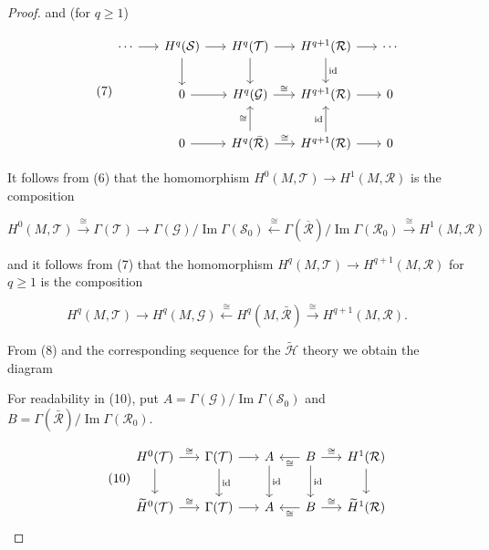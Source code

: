 \begin{proof}
and (for  $ q \geq 1 $)

\begin{equation}
\tag{7}\label{eq:5.23:7}
\begin{tikzcd}[ampersand replacement=\&, column sep=1.6em,row sep=2em]
\cdots \arrow[r] \& H^{q}(\mathcal S) \arrow[r] \arrow[d] \& H^{q}(\mathcal T) \arrow[r] \arrow[d] \& H^{q+1}(\mathcal R) \arrow[r] \arrow[d ,"{\mathrm{id}}"] \& \cdots \\
 \& 0 \arrow[r] \& H^{q}(\mathcal G) \arrow[r ,"{\cong}"] \& H^{q+1}(\mathcal R) \arrow[r] \& 0 \\
 \& 0 \arrow[r] \& H^{q}(\bar{\mathcal R}) \arrow[r ,"{\cong}"] \arrow[u ,"{\cong}"] \& H^{q+1}(\mathcal R) \arrow[r] \arrow[u ,"{\mathrm{id}}"] \& 0
\end{tikzcd}
\end{equation}

It follows from (6) that the homomorphism  $ H^{0}(M,\mathcal{T}) \to H^{1}(M,\mathcal{R}) $ is the composition

\begin{equation}
\tag{8}\label{eq:5.23:8}
H^0(M,\mathcal{T}) \xrightarrow{\cong} \Gamma(\mathcal{T}) \to \Gamma(\mathcal{G})/\operatorname{Im}\Gamma(\mathcal{S}_0) \xleftarrow{\cong} \Gamma(\overline{\mathcal{R}})/\operatorname{Im}\Gamma(\mathcal{R}_0) \xrightarrow{\cong} H^1(M,\mathcal{R})
\end{equation}

and it follows from (7) that the homomorphism  $ H^q(M,\mathcal{T}) \to H^{q+1}(M,\mathcal{R}) $ for  $ q \geq 1 $ is the composition

\begin{equation}
\tag{9}\label{eq:5.23:9}
H^{q}(M,\mathcal{T})\to H^{q}(M,\mathcal{G})\xleftarrow{\cong}H^{q}(M,\bar{\mathcal{R}})\xrightarrow{\cong}H^{q+1}(M,\mathcal{R}).
\end{equation}

From (8) and the corresponding sequence for the $\tilde{\mathcal{H}}$ theory we obtain the diagram

For readability in (10), put $A=\Gamma(\mathcal G)/\operatorname{Im}\Gamma(\mathcal S_0)$
and $B=\Gamma(\bar{\mathcal R})/\operatorname{Im}\Gamma(\mathcal R_0)$.

\begin{equation}
\tag{10}\label{eq:5.23:10}
\begin{tikzcd}[ampersand replacement=\&, column sep=1.6em,row sep=2em]
H^{0}(\mathcal T) \arrow[r ,"{\cong}"] \arrow[d] \& \Gamma(\mathcal T) \arrow[r] \arrow[d ,"{\mathrm{id}}"] \& A \arrow[d ,"{\mathrm{id}}"] \& B \arrow[l ,"{\cong}"] \arrow[r ,"{\cong}"] \arrow[d ,"{\mathrm{id}}"] \& H^{1}(\mathcal R) \arrow[d] \\
\widetilde H^{0}(\mathcal T) \arrow[r ,"{\cong}"] \& \Gamma(\mathcal T) \arrow[r] \& A \& B \arrow[l ,"{\cong}"] \arrow[r ,"{\cong}"] \& \widetilde H^{1}(\mathcal R)
\end{tikzcd}
\end{equation}


\end{proof}
